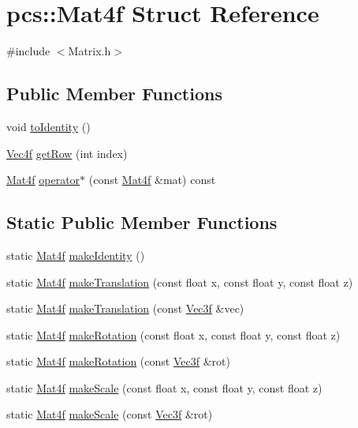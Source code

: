 \hypertarget{structpcs_1_1Mat4f}{}\section{pcs\+:\+:Mat4f Struct Reference}
\label{structpcs_1_1Mat4f}


{\ttfamily \#include $<$Matrix.\+h$>$}

\subsection*{Public Member Functions}
\begin{DoxyCompactItemize}
\item 
void \hyperlink{structpcs_1_1Mat4f_af43fedb87b0bf46325895dd098ae4600}{to\+Identity} ()
\item 
\hyperlink{namespacepcs_a826b4146f438aa3a4c6a5c157bc8dea2}{Vec4f} \hyperlink{structpcs_1_1Mat4f_a0703785e2c39f97f89c8305578f40ed8}{get\+Row} (int index)
\item 
\hyperlink{structpcs_1_1Mat4f}{Mat4f} \hyperlink{structpcs_1_1Mat4f_abf5cbb6f96fe61bbd09820868fe23cae}{operator$\ast$} (const \hyperlink{structpcs_1_1Mat4f}{Mat4f} \&mat) const
\end{DoxyCompactItemize}
\subsection*{Static Public Member Functions}
\begin{DoxyCompactItemize}
\item 
static \hyperlink{structpcs_1_1Mat4f}{Mat4f} \hyperlink{structpcs_1_1Mat4f_a3c7026479b0855ee1e1a4ff962872a95}{make\+Identity} ()
\item 
static \hyperlink{structpcs_1_1Mat4f}{Mat4f} \hyperlink{structpcs_1_1Mat4f_af221a379a3419f70b69c0339d499434c}{make\+Translation} (const float x, const float y, const float z)
\item 
static \hyperlink{structpcs_1_1Mat4f}{Mat4f} \hyperlink{structpcs_1_1Mat4f_aab015352eaa466dbb0c5c11d361f85af}{make\+Translation} (const \hyperlink{namespacepcs_a68e0f517680976c17c810ffe6952cbab}{Vec3f} \&vec)
\item 
static \hyperlink{structpcs_1_1Mat4f}{Mat4f} \hyperlink{structpcs_1_1Mat4f_a0bacf80f2ce6f50ad379299010a7cc44}{make\+Rotation} (const float x, const float y, const float z)
\item 
static \hyperlink{structpcs_1_1Mat4f}{Mat4f} \hyperlink{structpcs_1_1Mat4f_a46b7418d93345a9609304b54fea5ed98}{make\+Rotation} (const \hyperlink{namespacepcs_a68e0f517680976c17c810ffe6952cbab}{Vec3f} \&rot)
\item 
static \hyperlink{structpcs_1_1Mat4f}{Mat4f} \hyperlink{structpcs_1_1Mat4f_a76bf290cb265ba821bb1bb04b822f361}{make\+Scale} (const float x, const float y, const float z)
\item 
static \hyperlink{structpcs_1_1Mat4f}{Mat4f} \hyperlink{structpcs_1_1Mat4f_a7d4f035fc516774ddc99f17333712a69}{make\+Scale} (const \hyperlink{namespacepcs_a68e0f517680976c17c810ffe6952cbab}{Vec3f} \&rot)
\end{DoxyCompactItemize}
